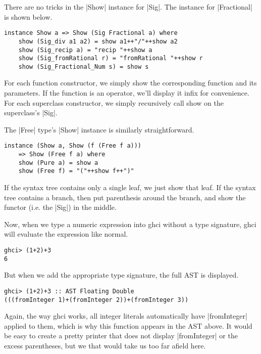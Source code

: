 \documentclass[preprint]{sigplanconf}
\theoremstyle{definition}
\begin{document}
There are no tricks in the |Show| instance for |Sig|.
The instance for |Fractional| is shown below.
\begin{lstlisting}
instance Show a => Show (Sig Fractional a) where
    show (Sig_div a1 a2) = show a1++"/"++show a2
    show (Sig_recip a) = "recip "++show a
    show (Sig_fromRational r) = "fromRational "++show r
    show (Sig_Fractional_Num s) = show s
\end{lstlisting}
For each function constructor, we simply show the corresponding function and its parameters.
If the function is an operator, we'll display it infix for convenience.
For each superclass constructor, we simply recursively call show on the superclass's |Sig|.

The |Free| type's |Show| instance is similarly straightforward.
\begin{lstlisting}
instance (Show a, Show (f (Free f a)))
    => Show (Free f a) where
    show (Pure a) = show a
    show (Free f) = "("++show f++")"
\end{lstlisting}
If the syntax tree contains only a single leaf, we just show that leaf.
If the syntax tree contains a branch,
then put parenthesis around the branch,
and show the functor (i.e. the |Sig|) in the middle.

Now, when we type a numeric expression into ghci without a type signature,
ghci will evaluate the expression like normal.
\begin{lstlisting}
ghci> (1+2)+3
6
\end{lstlisting}
But when we add the appropriate type signature,
the full AST is displayed.
\begin{lstlisting}
ghci> (1+2)+3 :: AST Floating Double
(((fromInteger 1)+(fromInteger 2))+(fromInteger 3))
\end{lstlisting}
Again, the way ghci works, all integer literals automatically have |fromInteger| applied to them,
which is why this function appears in the AST above.
It would be easy to create a pretty printer that does not display |fromInteger| or the excess parentheses,
but we that would take us too far afield here.
\end{document}
